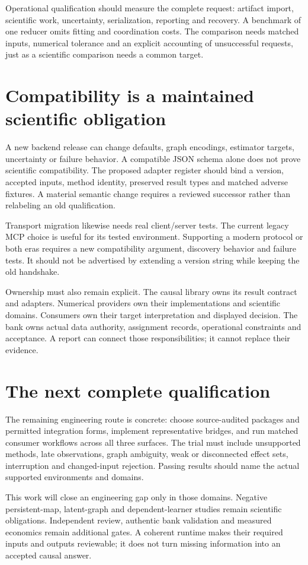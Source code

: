 Operational qualification should measure the complete request: artifact import,
scientific work, uncertainty, serialization, reporting and recovery. A benchmark
of one reducer omits fitting and coordination costs. The comparison needs
matched inputs, numerical tolerance and an explicit accounting of unsuccessful
requests, just as a scientific comparison needs a common target.

\section{Compatibility is a maintained scientific obligation}

A new backend release can change defaults, graph encodings, estimator targets,
uncertainty or failure behavior. A compatible JSON schema alone does not prove
scientific compatibility. The proposed adapter register should bind a version,
accepted inputs, method identity, preserved result types and matched adverse
fixtures. A material semantic change requires a reviewed successor rather than
relabeling an old qualification.

Transport migration likewise needs real client/server tests. The current legacy
MCP choice is useful for its tested environment. Supporting a modern protocol
or both eras requires a new compatibility argument, discovery behavior and
failure tests. It should not be advertised by extending a version string while
keeping the old handshake.

Ownership must also remain explicit. The causal library owns its result
contract and adapters. Numerical providers own their implementations and
scientific domains. Consumers own their target interpretation and displayed
decision. The bank owns actual data authority, assignment records, operational
constraints and acceptance. A report can connect those responsibilities; it
cannot replace their evidence.

\section{The next complete qualification}

The remaining engineering route is concrete: choose source-audited packages
and permitted integration forms, implement representative bridges, and run
matched consumer workflows across all three surfaces. The trial must include
unsupported methods, late observations, graph ambiguity, weak or disconnected
effect sets, interruption and changed-input rejection. Passing results should
name the actual supported environments and domains.

This work will close an engineering gap only in those domains. Negative
persistent-map, latent-graph and dependent-learner studies remain scientific
obligations. Independent review, authentic bank validation and measured
economics remain additional gates. A coherent runtime makes their required
inputs and outputs reviewable; it does not turn missing information into an
accepted causal answer.
